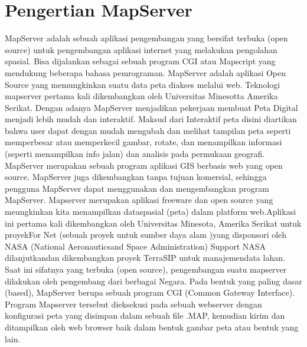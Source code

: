 \section{ Pengertian MapServer}

MapServer adalah sebuah aplikasi pengembangan yang bersifat terbuka (open source) untuk pengembangan aplikasi internet yang melakukan pengolahan spasial. Bisa dijalankan sebagai sebuah program CGI atau Mapscript yang mendukung beberapa bahasa pemrograman.
MapServer adalah aplikasi Open Source yang memungkinkan suatu data peta diakses melalui web. Teknologi mapserver pertama kali dikembangkan oleh Universitas Minesotta Amerika Serikat. Dengan adanya MapServer menjadikan pekerjaan membuat Peta Digital menjadi lebih mudah dan interaktif. Maksud dari Interaktif peta disini diartikan bahwa user dapat dengan mudah mengubah dan melihat tampilan peta seperti memperbesar atau memperkecil gambar, rotate, dan menampilkan informasi (seperti menampilkan info jalan) dan analisis pada permukaan geografi. 
MapServer merupakan sebuah program aplikasi GIS berbasis web yang open source. MapServer juga dikembangkan tanpa tujuan komersial, sehingga pengguna MapServer dapat menggunakan dan mengembangkan program MapServer. 
Mapserver merupakan aplikasi freeware dan open source yang meungkinkan kita menampilkan dataspasial (peta) dalam platform web.Aplikasi ini pertama kali dikembangkan oleh Universitas Minesota, Amerika Serikat untuk proyekFor Net (sebuah proyek untuk sumber daya alam )yang disponsori oleh NASA (National Aeronauticsand Space Administration) Support NASA dilanjutkandan dikembangkan proyek TerraSIP  untuk manajemendata lahan. Saat ini sifatnya yang terbuka (open source), pengembangan suatu mapserver dilakukan oleh pengembang dari berbagai Negara. 
Pada bentuk yang paling dasar (based), MapServer berupa sebuah  program CGI (Common Gateway Interface). Program Mapserver tersebut dieksekusi pada sebuah webserver dengan konfigurasi peta yang disimpan dalam sebuah file \*.MAP, kemudian kirim dan ditampilkan oleh web browser baik dalam bentuk gambar peta atau  bentuk yang lain. 
